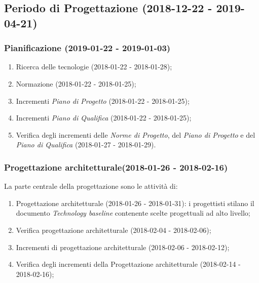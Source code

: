 	\newpage
	\subsection{Periodo di Progettazione (2018-12-22 - 2019-04-21)}	
		\subsubsection{Pianificazione (2019-01-22 - 2019-01-03)\\} 
			\begin{enumerate}[label = 3.1.\arabic*)]
				\item Ricerca delle tecnologie (2018-01-22 - 2018-01-28);
				\item Normazione (2018-01-22 - 2018-01-25);
				\item Incrementi \textit{Piano di Progetto} (2018-01-22 - 2018-01-25);
				\item Incrementi \textit{Piano di Qualifica} (2018-01-22 - 2018-01-25);
				\item Verifica degli incrementi delle \textit{Norme di Progetto}, del \textit{Piano di Progetto} e del \textit{Piano di Qualifica} (2018-01-27 - 2018-01-29).
			\end{enumerate}
	
		\subsubsection{Progettazione architetturale(2018-01-26 - 2018-02-16)\\} La parte centrale della progettazione sono le attività di:
			\begin{enumerate}[label = 3.2.\arabic*)]
				\item Progettazione architetturale (2018-01-26 - 2018-01-31): i progettisti stilano il documento \textit{Technology baseline} contenente scelte progettuali ad alto livello;
				\item Verifica progettazione architetturale (2018-02-04 - 2018-02-06);
				\item Incrementi di progettazione architetturale (2018-02-06 - 2018-02-12);
				\item Verifica degli incrementi della Progettazione architetturale (2018-02-14 - 2018-02-16);
			\end{enumerate}

